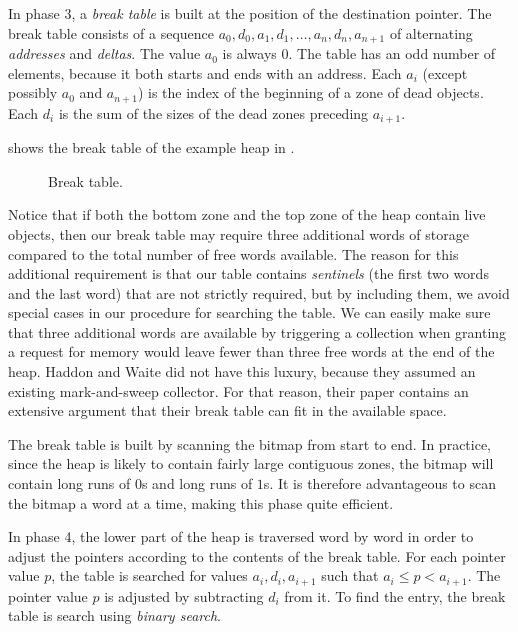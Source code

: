 In phase 3, a \emph{break table} is built at the position of the
destination pointer.  The break table consists of a sequence $a_0,
d_0, a_1, d_1, \ldots, a_n, d_n, a_{n+1}$ of alternating
\emph{addresses} and \emph{deltas}.  The value $a_0$ is always $0$.
The table has an odd number of elements, because it both starts and
ends with an address.  Each $a_i$ (except possibly $a_0$ and
$a_{n+1}$) is the index of the beginning of a zone of dead objects.
Each $d_i$ is the sum of the sizes of the dead zones preceding
$a_{i+1}$.

 shows the break table of the example heap in
.

\begin{figure}
\begin{center}
\end{center}
\caption{\label{fig-example-d}
Break table.}
\end{figure}

Notice that if both the bottom zone and the top zone of the heap
contain live objects, then our break table may require three additional
words of storage compared to the total number of free words available.
The reason for this additional requirement is that our table contains
\emph{sentinels} (the first two words and the last word) that are not
strictly required, but by including them, we avoid special cases in
our procedure for searching the table.  We can easily make sure that
three additional words are available by triggering a collection when
granting a request for memory would leave fewer than three free words
at the end of the heap.  Haddon and Waite \cite{Haddon:1967} did not
have this luxury, because they assumed an existing mark-and-sweep
collector.  For that reason, their paper contains an extensive
argument that their break table can fit in the available space.

The break table is built by scanning the bitmap from start to end.  In
practice, since the heap is likely to contain fairly large contiguous
zones, the bitmap will contain long runs of $0$s and long runs of
$1$s.  It is therefore advantageous to scan the bitmap a word at a
time, making this phase quite efficient. 

In phase 4, the lower part of the heap is traversed word by word in
order to adjust the pointers according to the contents of the break
table.  For each pointer value $p$, the table is searched for values 
$a_i, d_i, a_{i+1}$ such that $a_i \le p < a_{i+1}$.  The
pointer value $p$ is adjusted by subtracting $d_i$ from it.  To find
the entry, the break table is search using \emph{binary search}.

